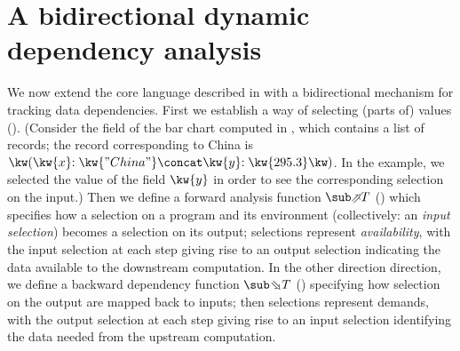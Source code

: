 \section{A bidirectional dynamic dependency analysis}
\label{sec:data-dependencies}

We now extend the core language described in  with a bidirectional mechanism for tracking data dependencies. First we establish a way of selecting (parts of) values (). (Consider the  field of the bar chart computed in , which contains a list of records; the record corresponding to China is $\exRec{\bind{\kw{x}}{\kw{"China"}} \concat \bind{\kw{y}}{\kw{295.3}}}$. In the example, we selected the value of the field $\kw{y}$ in order to see the corresponding selection on the input.) Then we define a forward analysis function $\evalFwdF{T}$ () which specifies how a selection on a program and its environment (collectively: an \emph{input selection}) becomes a selection on its output; selections represent \emph{availability}, with the input selection at each step giving rise to an output selection indicating the data available to the downstream computation. In the other direction direction, we define a backward dependency function $\evalBwdF{T}$ () specifying how selection on the output are mapped back to inputs; then selections represent demands, with the output selection at each step giving rise to an input selection identifying the data needed from the upstream computation.



